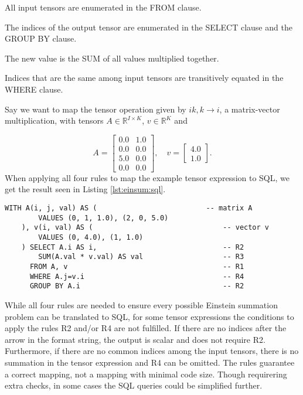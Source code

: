 \begin{description}[leftmargin=!,labelwidth=\widthof{\bfseries R1}]
    \item [R1] All input tensors are enumerated in the FROM clause.
    \item [R2] The indices of the output tensor are enumerated in the SELECT clause
          and the GROUP BY clause.
    \item [R3] The new value is the SUM of all values multiplied together.
    \item [R4] Indices that are the same among input tensors are transitively equated
          in the WHERE clause.
\end{description}
%
Say we want to map the tensor operation given by $ik,k \rightarrow i$, a matrix-vector
multiplication, with tensors $A \in \mathbb{R}^{I \times K}$, $v \in \mathbb{R}^{K}$ and

\begin{equation*}
    A =
    \begin{bmatrix}
        0.0 & 1.0 \\
        0.0 & 0.0 \\
        5.0 & 0.0 \\
        0.0 & 0.0
    \end{bmatrix},
    \quad
    v =
    \begin{bmatrix}
        4.0 \\
        1.0
    \end{bmatrix}.
\end{equation*}
%
When applying all four rules to map the example tensor expression to SQL, we get the result
seen in Listing \ref{lst:einsum:sql}.

\begin{lstlisting}[caption={Einstein summation in SQL.}, captionpos={t}, label={lst:einsum:sql}]
    WITH A(i, j, val) AS (                          -- matrix A
        VALUES (0, 1, 1.0), (2, 0, 5.0)
    ), v(i, val) AS (                               -- vector v
        VALUES (0, 4.0), (1, 1.0)
    ) SELECT A.i AS i,                              -- R2
        SUM(A.val * v.val) AS val                   -- R3
      FROM A, v                                     -- R1
      WHERE A.j=v.i                                 -- R4
      GROUP BY A.i                                  -- R2
\end{lstlisting}
%
While all four rules are needed to ensure every possible Einstein summation problem
can be translated to SQL, for some tensor expressions the conditions to apply the rules
R2 and/or R4 are not fulfilled. If there are no indices after the arrow in the format
string, the output is scalar and does not require R2. Furthermore, if there are no common
indices among the input tensors, there is no summation in the tensor expression and R4
can be omitted. The rules guarantee a correct mapping, not a mapping with minimal code size.
Though requirering extra checks, in some cases the SQL queries could be simplified further.


